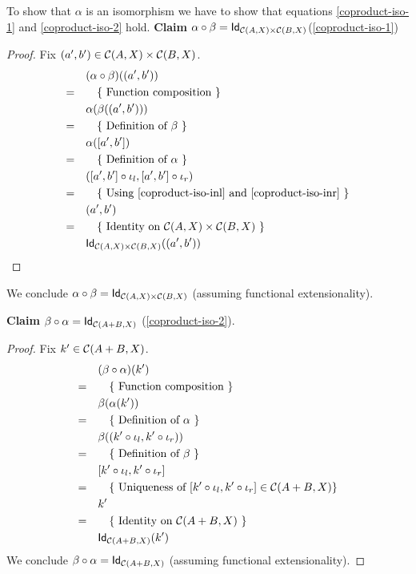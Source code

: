 \begin{solution}
To show that $\alpha$ is an isomorphism we have to show that equations \cref{coproduct-iso-1} and \cref{coproduct-iso-2} hold.
\textbf{Claim $\co {\beta} {\alpha} = \Id[\CQ]$}(\cref{coproduct-iso-1})
\begin{proof}
Fix $(a',b') \in \CQ$.
\begin{align*}
 &\quad (\co {\beta} {\alpha}) ((a',b'))\\
=&\qquad \text{\{ Function composition \}} \\
 &\quad \alpha(\beta((a',b'))) \\
=&\qquad \text{\{ Definition of $\beta$ \}} \\
 &\quad \alpha(\outofcoproduct{a'}{b'}) \\
=&\qquad \text{\{ Definition of $\alpha$ \}} \\
 &\quad (\co {\inl} {\outofcoproduct{a'}{b'}}, \co {\inr} {\outofcoproduct{a'}{b'}}) \\
=&\qquad \text{\{ Using \ref{coproduct-iso-inl} and \ref{coproduct-iso-inr} \}} \\
 &\quad (a', b') \\
=&\qquad \text{\{ Identity on $\CQ$ \}} \\
 &\quad \Id[\CQ]((a', b')) \\
\end{align*}
\end{proof}
We conclude $\co {\beta} {\alpha} = \Id[\CQ]$ (assuming functional extensionality).

\textbf{Claim $\co {\alpha} {\beta} = \Id[\CP]$} (\cref{coproduct-iso-2}).
\begin{proof}
Fix $k' \in \CP$.
\begin{align*}
 &\quad (\co {\alpha} {\beta}) (k')\\
=&\qquad \text{\{ Function composition \}} \\
 &\quad \beta(\alpha(k')) \\
=&\qquad \text{\{ Definition of $\alpha$ \}} \\
 &\quad \beta((\co {\inl} {k'}, \co {\inr} {k'}))\\
=&\qquad \text{\{ Definition of $\beta$ \}} \\
 &\quad \outofcoproduct{\co {\inl} {k'}}{\co {\inr} {k'}}\\
=&\qquad \text{\{ Uniqueness of $\outofcoproduct{\co {\inl} {k'}}{\co {\inr} {k'}} \in \CC(A+B,X) \}$} \\
 &\quad k'\\
=&\qquad \text{\{ Identity on $\CP$ \}} \\
 &\quad \Id[\CP] (k')
\end{align*}
We conclude $\co {\alpha} {\beta} = \Id[\CP]$ (assuming functional extensionality).
\end{proof}

\end{solution}

